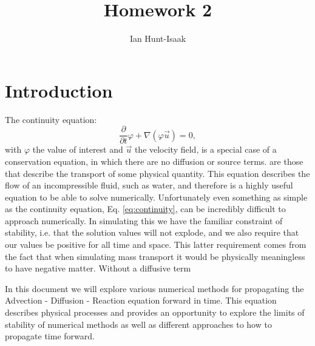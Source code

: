 \documentclass[]{article}
\title{Homework 2}
\author{Ian Hunt-Isaak}
\date{}
\begin{document}
\maketitle


\section{Introduction}
The continuity equation:
\begin{equation}
\frac{\partial}{\partial t} \varphi + \nabla(\varphi \vec{u}) = 0,
\label{eq:continuity}
\end{equation}
with $\varphi$ the value of interest and $\vec{u}$ the velocity field,  is a special case of a conservation equation, in which there are no diffusion or source terms. are those that describe the transport of some physical quantity. This equation describes the flow of an incompressible fluid, such as water, and therefore is a highly useful equation to be able to solve numerically. Unfortunately even something as simple as the continuity equation, Eq. \ref{eq:continuity}, can be incredibly difficult to approach numerically. In simulating this we have the familiar constraint of stability, i.e. that the solution values will not explode, and we also require that our values be positive for all time and space. This latter requirement comes from the fact that when simulating mass transport it would be physically meaningless to have negative matter. 
Without a diffusive term 




In this document we will explore various numerical methods for propagating the Advection - Diffusion - Reaction equation forward in time. This equation describes physical processes and provides an opportunity to explore the limits of stability of numerical methods as well as different approaches to how to propagate time forward. 
\end{document}
